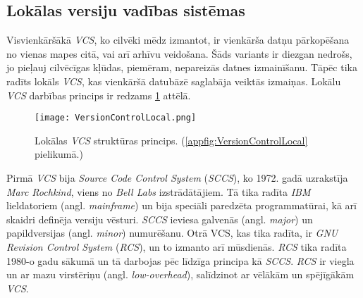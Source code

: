 \subsection{Lokālas versiju vadības sistēmas}
Visvienkāršākā \textit{VCS}, ko cilvēki mēdz izmantot, ir vienkārša datņu pārkopēšana no vienas mapes citā, vai arī arhīvu veidošana. Šāds variants ir diezgan nedrošs, jo pieļauj cilvēcīgas kļūdas, piemēram, nepareizās datnes izmainīšanu. Tāpēc tika radīts lokāls \textit{VCS}, kas vienkāršā datubāzē saglabāja veiktās izmaiņas. Lokālu \textit{VCS} darbības princips ir redzams \ref{fig:VersionControlLocal} attēlā.
\begin{figure}[H]%
	\centering
	\captionsetup{justification=centering}
	\texttt{[image: VersionControlLocal.png]}
	\caption{Lokālas \textit{VCS} struktūras princips. (\ref{appfig:VersionControlLocal} pielikumā.)}
	\label{fig:VersionControlLocal}
\end{figure}
Pirmā \textit{VCS} bija \textit{Source Code Control System} (\textit{SCCS}), ko 1972. gadā uzrakstīja \textit{Marc Rochkind}, viens no \textit{Bell Labs} izstrādātājiem. Tā tika radīta \textit{IBM} lieldatoriem (angl. \textit{mainframe}) un bija speciāli paredzēta programmatūrai, kā arī skaidri definēja versiju vēsturi. \textit{SCCS} ieviesa galvenās (angl. \textit{major}) un papildversijas (angl. \textit{minor}) numurēšanu.
Otrā VCS, kas tika radīta, ir \textit{GNU Revision Control System} (\textit{RCS}), un to izmanto arī mūsdienās. \textit{RCS} tika radīta 1980-o gadu sākumā un tā darbojas pēc līdzīga principa kā \textit{SCCS}. \textit{RCS} ir viegla un ar mazu virstēriņu (angl. \textit{low-overhead}), salīdzinot ar vēlākām un spējīgākām \textit{VCS}. \cite{chacon2014progit}

